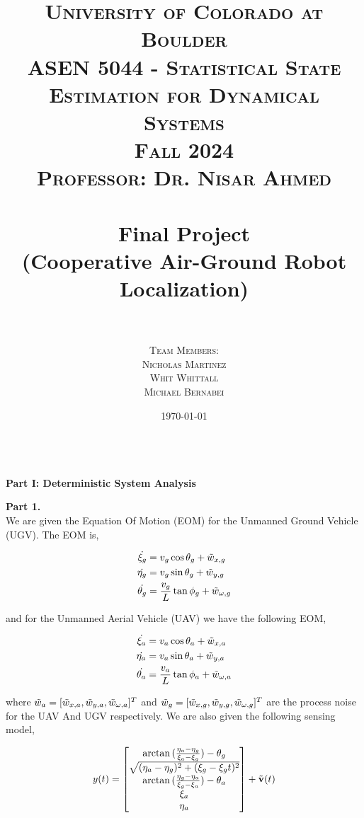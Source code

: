 \documentclass[paper=a4, fontsize=11pt]{scrartcl} %
\title{
\normalfont \LARGE
\textsc{University of Colorado at Boulder} \\ [25pt] %
\textsc{ASEN 5044 - Statistical State Estimation for Dynamical Systems} \\ [20pt]
\textsc{Fall 2024} \\ [20pt]
\textsc{Professor: Dr. Nisar Ahmed} \\ [12pt]
\horrule{1pt} \\[0.4cm] %
\huge Final Project \\ %
\huge (Cooperative Air-Ground Robot Localization) \\ 
\horrule{1pt} \\[0.6cm] %
}
\author{
  \textsc{ Team Members:} \\ [4 mm]
  \textsc{ Nicholas Martinez}\\[2mm]
  \textsc{ Whit Whittall } \\[2mm]
  \textsc{ Michael Bernabei}\\[2mm]
}
\date{\normalsize\today} %
\numberwithin{equation}{section} %
\numberwithin{figure}{section} %
\numberwithin{table}{section} %
\begin{document}
\maketitle %
\thispagestyle{empty} %
\newpage


%

\textbf{\\ Part I: Deterministic System Analysis }
\begin{framed}
\textbf{Part 1.} \\

We are given the Equation Of Motion (EOM) for the Unmanned Ground Vehicle (UGV).  The EOM is,

\begin{align*}
    \dot{\xi_g} &= v_g \cos{\theta_g} + \Tilde{w}_{x,g} \\
    \dot{\eta_g} &= v_g \sin{\theta_g} + \Tilde{w}_{y,g} \\
    \dot{\theta_g} &= \frac{v_g}{L}\tan{\phi_g}  + \Tilde{w}_{\omega,g} \\
\end{align*}

and for the Unmanned Aerial Vehicle (UAV) we have the following EOM,

\begin{align*}
    \dot{\xi_a} &= v_a \cos{\theta_a} + \Tilde{w}_{x,a} \\
    \dot{\eta_a} &= v_a \sin{\theta_a} + \Tilde{w}_{y,a} \\
    \dot{\theta_a} &= \frac{v_a}{L}\tan{\phi_a}  + \Tilde{w}_{\omega,a} \\
\end{align*}

where $\Tilde{w}_a = [ \Tilde{w}_{x,a},  \Tilde{w}_{y,a},  \Tilde{w}_{\omega,a}]^T$ and $\Tilde{w}_g = [ \Tilde{w}_{x,g},  \Tilde{w}_{y,g},  \Tilde{w}_{\omega,g}]^T$ are the process noise for the UAV And UGV respectively.  We are also given the following sensing model,

\begin{align*}
y(t) &=  
\begin{bmatrix} \arctan{(\frac{\eta_a - \eta_g}{\xi_a - \xi_g}}) - \theta_g   \\ 
                \sqrt{ (\eta_a - \eta_g)^2 + (\xi_g - \xi_gt)^2}  \\
                \arctan{(\frac{\eta_g - \eta_a}{\xi_g - \xi_a})} - \theta_a \\
                \xi_a \\
                \eta_a
\end{bmatrix}  + \Tilde{\bold{v}}(t) \\
\end{align*}


\end{framed}
\end{document}
